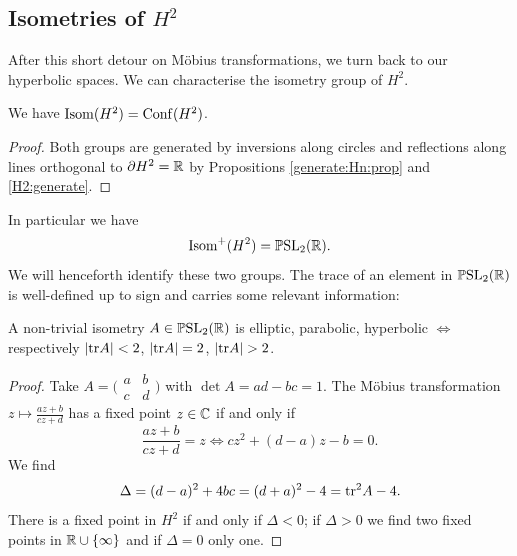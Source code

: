 \subsection{Isometries of $H^2$}
After this short detour on M\"obius transformations, we turn back to our hyperbolic spaces. We can characterise the isometry group of $H^2$. 
\begin{prop} \label{H2:prop}
We have ${\rm Isom}(H^2) = {\rm Conf}(H^2)$.
\end{prop}
\begin{proof}
Both groups are generated by inversions along circles and reflections along lines orthogonal to $\partial H^2 = \mathbb{R}$ by Propositions \ref{generate:Hn:prop} and \ref{H2:generate}.
\end{proof}

In particular we have
$${\rm Isom}^+(H^2) = \mathbb{P}{\rm SL}_2(\mathbb{R}).$$
We will henceforth identify these two groups.
The trace of an element in $\mathbb{P}{\rm SL}_2(\mathbb{R})$ is well-defined up to sign and carries some relevant information:
\begin{prop} \label{PSLR:prop}
A non-trivial isometry $A\in \mathbb{P}{\rm SL}_2(\mathbb{R})$ is elliptic, parabolic, hyperbolic $\Longleftrightarrow$ respectively $|{\rm tr} A|<2$, $|{\rm tr} A|=2$, $|\tr A|>2$.
\end{prop}
\begin{proof}
Take $A=\big(\begin{smallmatrix} a & b \\ c & d \end{smallmatrix}\big)$ with $\det A = ad-bc = 1$. The M\"obius transformation $z\mapsto \frac {az+b}{cz+d}$ has a fixed point $z\in\mathbb{C}$ if and only if
$$\frac{az+b}{cz+d} = z \Longleftrightarrow cz^2+(d-a)z-b = 0.$$
We find
$$\Delta = (d-a)^2 +4bc = (d+a)^2 - 4 = {\rm tr}^2 A - 4.$$
There is a fixed point in $H^2$ if and only if $\Delta <0$; if $\Delta > 0$ we find two fixed points in $\mathbb{R}\cup\{\infty\}$ and if $\Delta = 0$ only one.
\end{proof}

